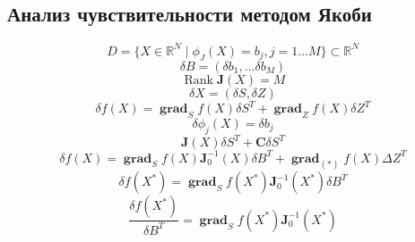 \documentclass[14pt]{extarticle}
\DeclareMathOperator{\grad}{\textbf{grad}}
\DeclareMathOperator{\rank}{Rank}
\begin{document}
  \subsection{Анализ чувствительности методом Якоби}
  \begin{equation}
	  D = \{X \in \mathbb{R}^{N} \mid \phi_{J}(X) = b_{j},
	  j = 1 \dots M\} \subset \mathbb{R}^{N}
  \end{equation} 
  \begin{equation}
  \delta B = (\delta b_1, \dots \delta b_{M} )
  \end{equation} 
  \begin{equation}
  \rank \mathbf{J}(X) = M
  \end{equation} 
  \begin{equation}
  \delta X = ( \delta S, \delta Z)
  \end{equation} 
  \begin{equation}
  \delta f(X)  = \grad_{S} f(X) \delta S^{T} +
  \grad_{Z} f(X) \delta Z^{T}
  \end{equation} 
  \begin{equation}
  \delta \phi_{j} (X) = \delta b_{j}
  \end{equation} 
  \begin{equation}
  \mathbf{J}(X) \delta S^{T} + \mathbf{C} \delta S^{T}
  \end{equation} 
  \begin{equation}
  \delta f(X) = \grad_{S} f(X) \mathbf{J}^{-1}_{0} (X) \delta B^{T}  + \grad_{(*)} f(X) \Delta Z^{T}
  \end{equation} 
  \begin{equation}
  \delta f(X^{*}) = \grad_{S} f(X^{*}) \mathbf{J}_{0}^{-1}(X^{*}) \delta B^{T}
  \end{equation} 
  \begin{equation}
	  \frac{\delta f(X^{*})}{\delta B^{T}} = \grad_{S} f(X^{*}) \mathbf{J}_{0}^{-1}(X^{*})
  \end{equation} 
\end{document}
